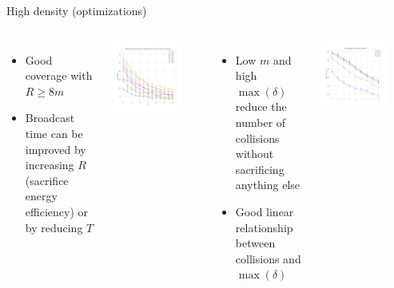 \documentclass[aspectratio=169]{beamer}
\begin{document}
\begin{frame}{High density (optimizations)}
	\begin{columns}
		\footnotesize
		\begin{itemize}
			\item Good coverage with \(R \ge 8m\)
			\item Broadcast time can be improved by increasing \(R\)
				(sacrifice energy efficiency) or by reducing
				\(T\)
		\end{itemize}
		\begin{center}
			\includegraphics[width=0.8\textwidth]{img/hd/broadcasttime-R-ffplot}
		\end{center}
		\begin{itemize}
			\item Low \(m\) and high \(\max(\delta)\) reduce the
				number of collisions without sacrificing
				anything else
			\item Good linear relationship between collisions and
				\(\max(\delta)\)
		\end{itemize}
		\begin{center}
			\includegraphics[width=0.75\textwidth]{img/hd/collisions-D-ffplot}
		\end{center}
	\end{columns}
\end{frame}
\end{document}
